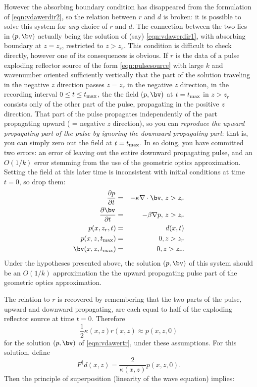 However the absorbing boundary condition has disappeared from the formulation of \ref{eqn:vdawerdir2}, so the relation between $r$ and $d$ is broken: it is possible to solve this system for {\em any} choice of $r$ and $d$. The connection between the two lies in $(p,\bv)$ actually being the solution of (say) \ref{eqn:vdawerdir1}, with absorbing boundary at $z=z_r$, restricted to $z>z_r$. This condition is difficult to check directly, however one of its consequences is obvious. If $r$ is the data of a pulse exploding reflector source of the form \ref{eqn:pulsesource} with large $k$ and wavenumber oriented sufficiently vertically that the part of the solution traveling in the negative $z$ direction passes $z=z_r$ in the negative $z$ direction, in the recording interval $0 \le t \le t_{\rm max}$, the the field $(p,\bv)$ at $t=t_{\rm max}$ in $z > z_r$ consists only of the other part of the pulse, propagating in the positive $z$ direction. That part of the pulse propagates independently of the part propagating upward ( = negative $z$ direction), so you can {\em reproduce the upward propagating part of the pulse by ignoring the downward propagating part}: that is, you can simply zero out the field at $t=t_{\rm max}$. In so doing, you have committed two errors: an error of leaving out the entire downward propagating pulse, and an $O(1/k)$ error stemming from the use of the geometric optics approximation. Setting the field at this later time is inconsistent with initial conditions at time $t=0$, so drop them:
\begin{eqnarray}
\label{eqn:vdawertr}
\frac{\partial p}{\partial t}&=& -\kappa \nabla \cdot \bv , \, z>z_r \nonumber \\
\frac{\partial \bv}{\partial t} &=& -\beta \nabla p, \, z>z_r \nonumber \\
p(x,z_r,t) & = & d(x,t) \nonumber \\
p(x,z,t_{\rm max}) & = & 0, z > z_r \nonumber \\
\bv(x,z,t_{\rm max}) & = & 0, z > z_r. 
\end{eqnarray}
Under the hypotheses presented above, the solution $(p,\bv)$ of this system should be an $O(1/k)$ approximation the the upward propagating pulse part of the geometric optics approximation.

The relation to $r$ is recovered by remembering that the two parts of the pulse, upward and downward propagating, are each equal to half of the exploding reflector source at time $t=0$. Therefore 
\[
\frac{1}{2}\kappa(x,z)r(x,z) \approx p(x,z,0)
\]
for the solution $(p,\bv)$ of \ref{eqn:vdawertr}, under these assumptions. For this solution, define
\begin{equation}
\label{eqn:psinvpsinv}
F^{\dagger}d(x,z) = \frac{2}{\kappa(x,z)} p(x,z,0).
\end{equation}
Then the principle of superposition (linearity of the wave equation) implies: 

